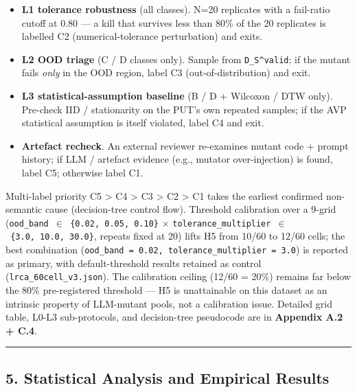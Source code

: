 \documentclass[review,12pt,authoryear]{elsarticle}
\providecommand{\tightlist}{\setlength{\itemsep}{0pt}\setlength{\parskip}{0pt}}
\begin{document}
\begin{itemize}
\tightlist
\item
  \textbf{L1 tolerance robustness} (all classes). N=20 replicates with a
  fail-ratio cutoff at 0.80 --- a kill that survives less than 80\% of
  the 20 replicates is labelled C2 (numerical-tolerance perturbation)
  and exits.
\item
  \textbf{L2 OOD triage} (C / D classes only). Sample from
  \texttt{D\_S\^{}valid}; if the mutant fails \emph{only} in the OOD
  region, label C3 (out-of-distribution) and exit.
\item
  \textbf{L3 statistical-assumption baseline} (B / D + Wilcoxon / DTW
  only). Pre-check IID / stationarity on the PUT's own repeated samples;
  if the AVP statistical assumption is itself violated, label C4 and
  exit.
\item
  \textbf{Artefact recheck}. An external reviewer re-examines mutant
  code + prompt history; if LLM / artefact evidence (e.g., mutator
  over-injection) is found, label C5; otherwise label C1.
\end{itemize}

Multi-label priority C5 \textgreater{} C4 \textgreater{} C3
\textgreater{} C2 \textgreater{} C1 takes the earliest confirmed
non-semantic cause (decision-tree control flow). Threshold calibration
over a 9-grid (\texttt{ood\_band\ $\in$\ \{0.02,\ 0.05,\ 0.10\}} $\times$
\texttt{tolerance\_multiplier\ $\in$\ \{3.0,\ 10.0,\ 30.0\}}, repeats fixed
at 20) lifts H5 from 10/60 to 12/60 cells; the best combination
(\texttt{ood\_band\ =\ 0.02,\ tolerance\_multiplier\ =\ 3.0}) is
reported as primary, with default-threshold results retained as control
(\texttt{lrca\_60cell\_v3.json}). The calibration ceiling (12/60 = 20\%)
remains far below the 80\% pre-registered threshold --- H5 is
unattainable on this dataset as an intrinsic property of LLM-mutant
pools, not a calibration issue. Detailed grid table, L0-L3
sub-protocols, and decision-tree pseudocode are in \textbf{Appendix A.2
+ C.4}.

\begin{center}\rule{0.5\linewidth}{0.5pt}\end{center}

\subsection{5. Statistical Analysis and Empirical
Results}\label{statistical-analysis-and-empirical-results}
\end{document}

